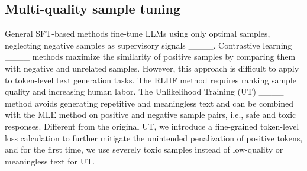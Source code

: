 \subsection{Multi-quality sample tuning}
General SFT-based methods fine-tune LLMs using only optimal samples, neglecting negative samples as supervisory signals ____. Contrastive learning ____ methods maximize the similarity of positive samples by comparing them with negative and unrelated samples. However, this approach is difficult to apply to token-level text generation tasks. The RLHF method requires ranking sample quality and increasing human labor. The Unlikelihood Training (UT) ____ method avoids generating repetitive and meaningless text and can be combined with the MLE method on positive and negative sample pairs, i.e., safe and toxic responses. Different from the original UT, we introduce a fine-grained token-level loss calculation to further mitigate the unintended penalization of positive tokens, and for the first time, we use severely toxic samples instead of low-quality or meaningless text for UT.